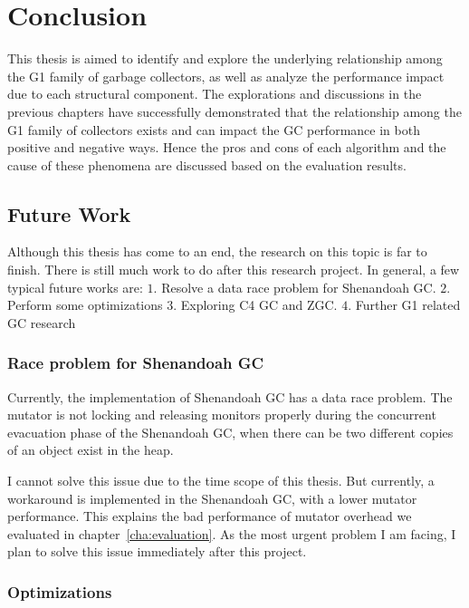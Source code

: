 \chapter{Conclusion}
\label{cha:conc}

This thesis is aimed to identify and explore the underlying relationship among the
G1 family of garbage collectors, as well as analyze the performance impact due to
each structural component.
The explorations and discussions in the previous chapters have successfully demonstrated
that the relationship among the G1 family of collectors exists and can impact the GC
performance in both positive and negative ways.
Hence the pros and cons of each algorithm and the cause of these phenomena
are discussed based on the evaluation results.

\section{Future Work}
\label{sec:future}

Although this thesis has come to an end, the research on this topic is far to finish.
There is still much work to do after this research project.
In general, a few typical future works are:
$1.$ Resolve a data race problem for Shenandoah GC.
$2.$ Perform some optimizations
$3.$ Exploring C4 GC and ZGC.
$4.$ Further G1 related GC research

\subsection{Race problem for Shenandoah GC}

Currently, the implementation of Shenandoah GC has a data race problem.
The mutator is not locking and releasing monitors
properly during the concurrent evacuation phase of the Shenandoah GC, when there can be
two different copies of an object exist in the heap.

I cannot solve this issue due to the time scope of this thesis.
But currently, a workaround is implemented in the Shenandoah GC, with a lower mutator performance.
This explains the bad performance of mutator overhead we evaluated in chapter~\ref{cha:evaluation}.
As the most urgent problem I am facing, I plan to solve this issue immediately after
this project.

\subsection{Optimizations}

